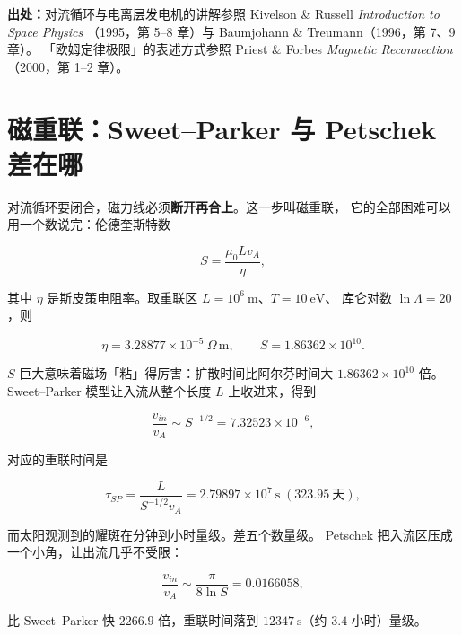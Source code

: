 {\footnotesize
\textbf{出处：}对流循环与电离层发电机的讲解参照 Kivelson \& Russell \emph{Introduction to Space Physics}
（1995，第 5--8 章）与 Baumjohann \& Treumann（1996，第 7、9 章）。
「欧姆定律极限」的表述方式参照 Priest \& Forbes \emph{Magnetic Reconnection}（2000，第 1--2 章）。
}

\section{磁重联：Sweet--Parker 与 Petschek 差在哪}
\label{sec:app-ab-reconnection}

对流循环要闭合，磁力线必须\textbf{断开再合上}。这一步叫磁重联，
它的全部困难可以用一个数说完：伦德奎斯特数

\begin{equation}
S=\frac{\mu_0 L v_A}{\eta},
\label{eq:app-ab-lundquist}
\end{equation}

其中 $\eta$ 是斯皮策电阻率。取重联区 $L=10^{6}\ \mathrm{m}$、$T=10\ \mathrm{eV}$、
库仑对数 $\ln\Lambda=20$，则

\begin{equation}
\eta=3.28877\times10^{-5}\ \Omega\,\mathrm{m},\qquad
S=1.86362\times10^{10}.
\label{eq:app-ab-eta}
\end{equation}

$S$ 巨大意味着磁场「粘」得厉害：扩散时间比阿尔芬时间大 $1.86362\times10^{10}$ 倍。
Sweet--Parker 模型让入流从整个长度 $L$ 上收进来，得到

\begin{equation}
\frac{v_{in}}{v_A}\sim S^{-1/2}=7.32523\times10^{-6},
\label{eq:app-ab-sp}
\end{equation}

对应的重联时间是

\begin{equation}
\tau_{SP}=\frac{L}{S^{-1/2}v_A}=2.79897\times10^{7}\ \mathrm{s}\;(323.95\ \text{天}),
\label{eq:app-ab-sptime}
\end{equation}

而太阳观测到的耀斑在分钟到小时量级。差五个数量级。
Petschek 把入流区压成一个小角，让出流几乎不受限：

\begin{equation}
\frac{v_{in}}{v_A}\sim\frac{\pi}{8\ln S}=0.0166058,
\label{eq:app-ab-petschek}
\end{equation}

比 Sweet--Parker 快 $2266.9$ 倍，重联时间落到 $12347\ \mathrm{s}$（约 $3.4$ 小时）量级。


